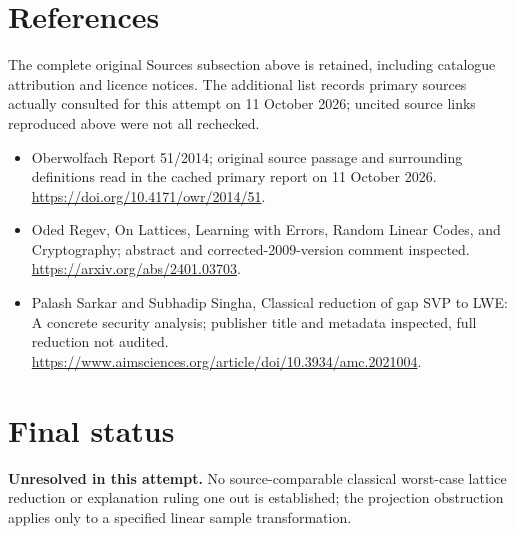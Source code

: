 \documentclass[11pt]{article}
\begin{document}
\section{References}
The complete original Sources subsection above is retained, including catalogue attribution and licence notices. The additional list records primary sources actually consulted for this attempt on 11 October 2026; uncited source links reproduced above were not all rechecked.
\begin{itemize}
\item Oberwolfach Report 51/2014; original source passage and surrounding definitions read in the cached primary report on 11 October 2026. \url{https://doi.org/10.4171/owr/2014/51}.
\item Oded Regev, On Lattices, Learning with Errors, Random Linear Codes, and Cryptography; abstract and corrected-2009-version comment inspected. \url{https://arxiv.org/abs/2401.03703}.
\item Palash Sarkar and Subhadip Singha, Classical reduction of gap SVP to LWE: A concrete security analysis; publisher title and metadata inspected, full reduction not audited. \url{https://www.aimsciences.org/article/doi/10.3934/amc.2021004}.
\end{itemize}
\section{Final status}
\textbf{Unresolved in this attempt.} No source-comparable classical worst-case lattice reduction or explanation ruling one out is established; the projection obstruction applies only to a specified linear sample transformation.
\end{document}
